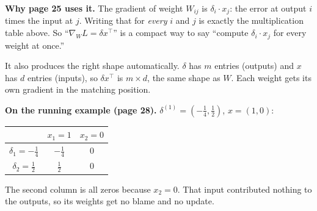 \textbf{Why page 25 uses it.} The gradient of weight $W_{ij}$ is $\delta_i \cdot x_j$: the error at output $i$ times the input at $j$. Writing that for \emph{every} $i$ and $j$ is exactly the multiplication table above. So ``$\nabla_W L = \delta x^\top$'' is a compact way to say ``compute $\delta_i \cdot x_j$ for every weight at once.''

It also produces the right shape automatically. $\delta$ has $m$ entries (outputs) and $x$ has $d$ entries (inputs), so $\delta x^\top$ is $m \times d$, the same shape as $W$. Each weight gets its own gradient in the matching position.

\textbf{On the running example (page 28).} $\delta^{(1)} = (-\tfrac14, \tfrac12)$, $x = (1, 0)$:

\begin{tabular}{ccc}
\toprule
 & $x_1 = 1$ & $x_2 = 0$ \\
\midrule
$\delta_1 = -\tfrac14$ & $-\tfrac14$ & 0 \\
$\delta_2 = \tfrac12$ & $\tfrac12$ & 0 \\
\bottomrule
\end{tabular}

The second column is all zeros because $x_2 = 0$. That input contributed nothing to the outputs, so its weights get no blame and no update.